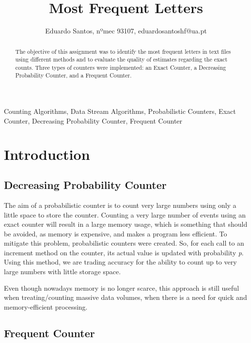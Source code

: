 \documentclass[...]{revdetua}
\begin{document}

\title{Most Frequent Letters}
\author{Eduardo Santos, nºmec 93107, eduardosantoshf@ua.pt} %
\maketitle

\begin{abstract}
The objective of this assignment was to identify the most frequent letters in text files  using different methods and to evaluate the quality of estimates regarding the exact counts. Three types of counters were implemented: an Exact Counter, a Decreasing Probability Counter, and a Frequent Counter. 
\end{abstract}

\begin{keywords}{Counting Algorithms, Data Stream Algorithms, Probabilistic Counters, Exact Counter, Decreasing Probability Counter, Frequent Counter}
\end{keywords}

\section{Introduction}

\subsection{Decreasing Probability Counter}

The aim of a probabilistic counter is to count very large numbers using only a little space to store the counter. Counting a very large number of events using an exact counter will result in a large memory usage, which is something that should be avoided, as memory is expensive, and makes a program less efficient. To mitigate this problem, probabilistic counters were created. So, for each call to an increment method on the counter, its actual value is updated with probability \textit{p}. Using this method, we are trading accuracy for the ability to count up to very large numbers with little storage space.

Even though nowadays memory is no longer scarce, this approach is still useful when treating/counting massive data volumes, when there is a need for quick and memory-efficient processing.

\subsection{Frequent Counter}
\end{document}
